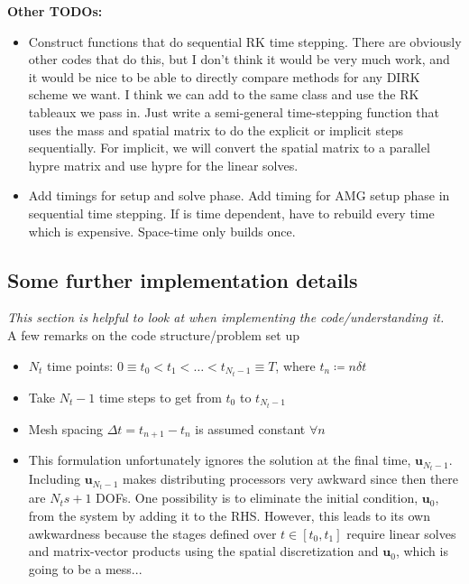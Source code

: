 \documentclass[a4paper,10pt]{article}
\begin{document}
\noindent\textbf{Other TODOs:}
\begin{itemize}
\item Construct functions that do sequential RK time stepping. There are obviously other codes that do
this, but I don't think it would be very much work, and it would be nice to be able to directly compare methods
for any DIRK scheme we want. I think we can add to the same class and use the RK tableaux we pass in. 
Just write a semi-general time-stepping function that uses the mass and spatial matrix to do the
explicit or implicit steps sequentially. For implicit, we will convert the spatial matrix to a parallel hypre
matrix and use hypre for the linear solves. 

\item Add timings for setup and solve phase. Add timing for AMG setup phase in sequential time stepping.
If is time dependent, have to rebuild every time which is expensive. Space-time only builds once. 

\end{itemize}





\subsection{Some further implementation details}
\textit{This section is helpful to look at when implementing the code/understanding it.} \\

\noindent A few remarks on the code structure/problem set up
\begin{itemize}
\item $N_t$ time points: $0 \equiv t_0 < t_1 < \ldots < t_{N_t-1} \equiv T$, where $t_n \coloneqq n \delta t$
\item Take $N_t-1$ time steps to get from $t_0$ to $t_{N_t-1}$
\item Mesh spacing $\Delta t = t_{n+1} - t_{n}$ is assumed constant $\forall n$
\item This formulation unfortunately ignores the solution at the final time, $\mathbf{u}_{N_t-1}$. Including $\mathbf{u}_{N_t-1}$ makes distributing processors very awkward since then there are $N_t s + 1$ DOFs. One possibility is to eliminate the initial condition, $\mathbf{u}_0$, from the system by adding it to the RHS. However, this leads to its own awkwardness because the stages defined over $t \in [t_0,t_1]$ require linear solves and matrix-vector products using the spatial discretization and $\mathbf{u}_0$, which is going to be a mess...
\end{itemize}
\end{document}
